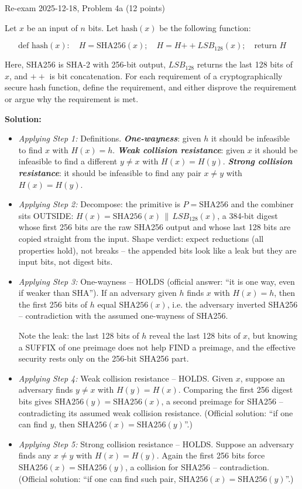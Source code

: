 \documentclass[12pt, a4paper]{article}
\newcommand{\term}[1]{\textbf{\textit{#1}}}        %
\begin{document}
\begin{practicebox}{Re-exam 2025-12-18, Problem 4a (12 points)}
\begin{problembox}
Let $x$ be an input of $n$ bits. Let $\mathrm{hash}(x)$ be the following function:

\[
\text{def } \mathrm{hash}(x):\quad H = \mathrm{SHA256}(x);\quad H = H \mathbin{++} LSB_{128}(x);\quad \text{return } H
\]

Here, SHA256 is SHA-2 with 256-bit output, $LSB_{128}$ returns the last 128 bits of $x$, and $\mathbin{++}$ is bit concatenation. For each requirement of a cryptographically secure hash function, define the requirement, and either disprove the requirement or argue why the requirement is met.
\end{problembox}

\textbf{Solution:}
\begin{itemize}
    \item \textit{Applying Step 1:} Definitions. \term{One-wayness}: given $h$ it should be infeasible to find $x$ with $H(x) = h$. \term{Weak collision resistance}: given $x$ it should be infeasible to find a different $y \neq x$ with $H(x) = H(y)$. \term{Strong collision resistance}: it should be infeasible to find any pair $x \neq y$ with $H(x) = H(y)$.
    \item \textit{Applying Step 2:} Decompose: the primitive is $P = \mathrm{SHA256}$ and the combiner sits OUTSIDE: $H(x) = \mathrm{SHA256}(x) \,\|\, LSB_{128}(x)$, a 384-bit digest whose first 256 bits are the raw SHA256 output and whose last 128 bits are copied straight from the input.
    Shape verdict: expect reductions (all properties hold), not breaks -- the appended bits look like a leak but they are input bits, not digest bits.
    \item \textit{Applying Step 3:} One-wayness -- HOLDS (official answer: ``it is one way, even if weaker than SHA''). If an adversary given $h$ finds $x$ with $H(x) = h$, then the first 256 bits of $h$ equal $\mathrm{SHA256}(x)$, i.e. the adversary inverted SHA256 -- contradiction with the assumed one-wayness of SHA256.

    Note the leak: the last 128 bits of $h$ reveal the last 128 bits of $x$, but knowing a SUFFIX of one preimage does not help FIND a preimage, and the effective security rests only on the 256-bit SHA256 part.
    \item \textit{Applying Step 4:} Weak collision resistance -- HOLDS. Given $x$, suppose an adversary finds $y \neq x$ with $H(y) = H(x)$. Comparing the first 256 digest bits gives $\mathrm{SHA256}(y) = \mathrm{SHA256}(x)$, a second preimage for SHA256 -- contradicting its assumed weak collision resistance. (Official solution: ``if one can find $y$, then $\mathrm{SHA256}(x) = \mathrm{SHA256}(y)$''.)
    \item \textit{Applying Step 5:} Strong collision resistance -- HOLDS. Suppose an adversary finds any $x \neq y$ with $H(x) = H(y)$. Again the first 256 bits force $\mathrm{SHA256}(x) = \mathrm{SHA256}(y)$, a collision for SHA256 -- contradiction. (Official solution: ``if one can find such pair, $\mathrm{SHA256}(x) = \mathrm{SHA256}(y)$''.)
\end{itemize}


\end{practicebox}
\end{document}
